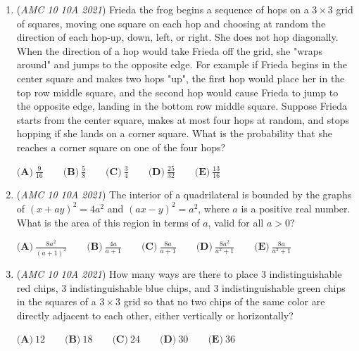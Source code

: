 \begin{enumerate}
 $\textbf{(A)} ~10\qquad\textbf{(B)} ~13\qquad\textbf{(C)} ~15\qquad\textbf{(D)} ~17\qquad\textbf{(E)} ~20$


	\item (\textit{AMC 10 10A 2021}) Frieda the frog begins a sequence of hops on a $3 \times 3$ grid of squares, moving one square on each hop and choosing at random the direction of each hop-up, down, left, or right. She does not hop diagonally. When the direction of a hop would take Frieda off the grid, she "wraps around" and jumps to the opposite edge. For example if Frieda begins in the center square and makes two hops "up", the first hop would place her in the top row middle square, and the second hop would cause Frieda to jump to the opposite edge, landing in the bottom row middle square. Suppose Frieda starts from the center square, makes at most four hops at random, and stops hopping if she lands on a corner square. What is the probability that she reaches a corner square on one of the four hops?


 $\textbf{(A)} ~\frac{9}{16}\qquad\textbf{(B)} ~\frac{5}{8}\qquad\textbf{(C)} ~\frac{3}{4}\qquad\textbf{(D)} ~\frac{25}{32}\qquad\textbf{(E)} ~\frac{13}{16}$


	\item (\textit{AMC 10 10A 2021}) The interior of a quadrilateral is bounded by the graphs of $(x+ay)^2 = 4a^2$ and $(ax-y)^2 = a^2$, where $a$ is a positive real number. What is the area of this region in terms of $a$, valid for all $a > 0$?


 $\textbf{(A)} ~\frac{8a^2}{(a+1)^2}\qquad\textbf{(B)} ~\frac{4a}{a+1}\qquad\textbf{(C)} ~\frac{8a}{a+1}\qquad\textbf{(D)} ~\frac{8a^2}{a^2+1}\qquad\textbf{(E)} ~\frac{8a}{a^2+1}$


	\item (\textit{AMC 10 10A 2021}) How many ways are there to place $3$ indistinguishable red chips, $3$ indistinguishable blue chips, and $3$ indistinguishable green chips in the squares of a $3 \times 3$ grid so that no two chips of the same color are directly adjacent to each other, either vertically or horizontally?


 $\textbf{(A)} ~12\qquad\textbf{(B)} ~18\qquad\textbf{(C)} ~24\qquad\textbf{(D)} ~30\qquad\textbf{(E)} ~36$


\end{enumerate}